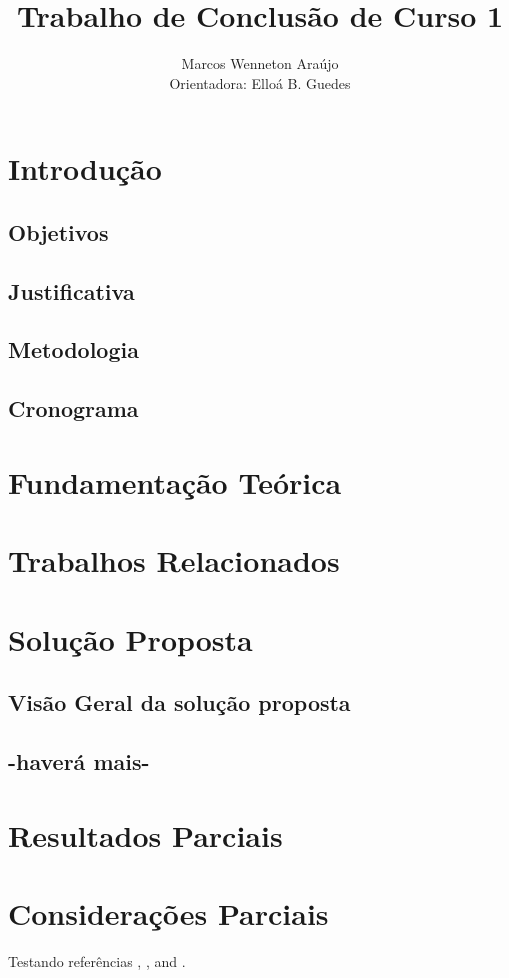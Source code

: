 \documentclass[12pt]{article}
\title{Trabalho de Conclusão de Curso 1}
\author{Marcos Wenneton Araújo\\ 
Orientadora: Elloá B. Guedes}
\begin{document}
 

\maketitle


\section{Introdução} \label{sec:introducao}

\subsection{Objetivos}

\subsection{Justificativa}

\subsection{Metodologia}

\subsection{Cronograma}

\section{Fundamentação Teórica} \label{sec:fund-teor}



\section{Trabalhos Relacionados} \label{sec:trab-rel}



\section{Solução Proposta} \label{sec:sol-prop}

\subsection{Visão Geral da solução proposta}

\subsection{-haverá mais-}

\section{Resultados Parciais} \label{sec:res-parc}


\section{Considerações Parciais} \label{sec:cons-parc}

Testando referências \cite{knuth:84},
\cite{boulic:91}, and \cite{smith:99}.




\end{document}
